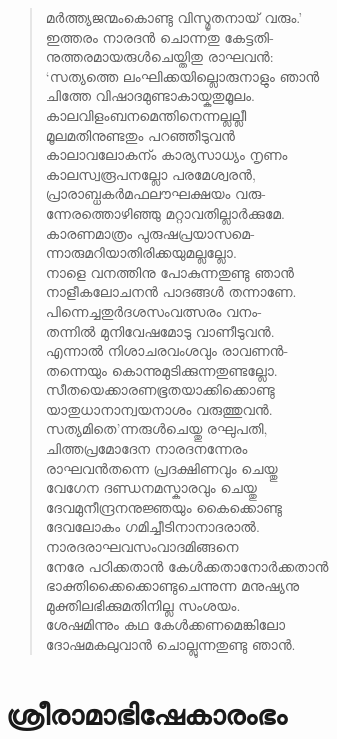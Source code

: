 \begin{verse}
മര്‍ത്ത്യജന്മംകൊണ്ടു വിസ്മൃതനായ് വരും.’\\
ഇത്തരം നാരദന്‍ ചൊന്നതു കേട്ടതി-\\
നുത്തരമായരുള്‍ചെയ്തിതു രാഘവന്‍:\\
‘സത്യത്തെ ലംഘിക്കയില്ലൊരുനാളും ഞാന്‍\\
ചിത്തേ വിഷാദമുണ്ടാകായ്കതുമൂലം.\\
കാലവിളംബനമെന്തിനെന്നല്ലല്ലീ\\
മൂലമതിനുണ്ടതും പറഞ്ഞീടുവന്‍\\
കാലാവലോകന്ം കാര്യസാധ്യം നൃണം\\
കാലസ്വരൂപനല്ലോ പരമേശ്വരന്‍,\\
പ്രാരാബ്ധകര്‍മഫലൗഘക്ഷയം വരു-\\
ന്നേരത്തൊഴിഞ്ഞു മറ്റാവതില്ലാര്‍ക്കുമേ.\\
കാരണമാത്രം പുരുഷപ്രയാസമെ-\\
ന്നാരുമറിയാതിരിക്കയുമല്ലല്ലോ.\\
നാളെ വനത്തിനു പോകുന്നതുണ്ടു ഞാന്‍\\
നാളീകലോചനന്‍ പാദങ്ങള്‍ തന്നാണേ.\\
പിന്നെച്ചതുര്‍ദശസംവത്സരം വനം-\\
തന്നില്‍ മുനിവേഷമോടു വാണീടുവന്‍.\\
എന്നാല്‍ നിശാചരവംശവും രാവണന്‍-\\
തന്നെയും കൊന്നുമുടിക്കുന്നതുണ്ടല്ലോ.\\
സീതയെക്കാരണഭൂതയാക്കിക്കൊണ്ടു\\
യാതുധാനാന്വയനാശം വരുത്തുവന്‍.\\
സത്യമിതെ’ന്നരുള്‍ചെയ്തു രഘുപതി,\\
ചിത്തപ്രമോദേന നാരദനന്നേരം\\
രാഘവന്‍തന്നെ പ്രദക്ഷിണവും ചെയ്തു\\
വേഗേന ദണ്ഡനമസ്കാരവും ചെയ്തു\\
ദേവമുനീന്ദ്രനനുജ്ഞയും കൈക്കൊണ്ടു\\
ദേവലോകം ഗമിച്ചീടിനാനാദരാല്‍.\\
നാരദരാഘവസംവാദമിങ്ങനെ\\
നേരേ പഠിക്കതാന്‍ കേള്‍ക്കതാനോര്‍ക്കതാന്‍\\
ഭാക്തിക്കൈക്കൊണ്ടുചെന്നുന്ന മനുഷ്യനു\\
മുക്തിലഭിക്കുമതിനില്ല സംശയം.\\
ശേഷമിന്നും കഥ കേള്‍ക്കണമെങ്കിലോ\\
ദോഷമകലുവാന്‍ ചൊല്ലുന്നതുണ്ടു ഞാന്‍.
\end{verse}


\section{ശ്രീരാമാഭിഷേകാരംഭം}


